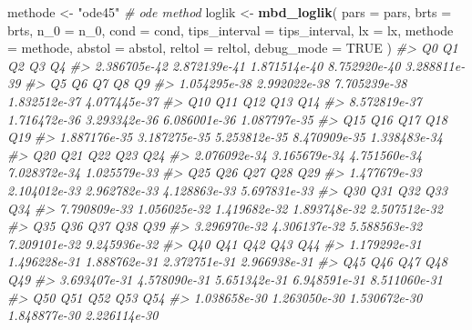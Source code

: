 \documentclass[]{article}
\newenvironment{Shaded}{\begin{snugshade}}{\end{snugshade}}
\newcommand{\CommentTok}[1]{\textcolor[rgb]{0.56,0.35,0.01}{\textit{#1}}}
\newcommand{\DataTypeTok}[1]{\textcolor[rgb]{0.13,0.29,0.53}{#1}}
\newcommand{\DecValTok}[1]{\textcolor[rgb]{0.00,0.00,0.81}{#1}}
\newcommand{\KeywordTok}[1]{\textcolor[rgb]{0.13,0.29,0.53}{\textbf{#1}}}
\newcommand{\NormalTok}[1]{#1}
\newcommand{\OtherTok}[1]{\textcolor[rgb]{0.56,0.35,0.01}{#1}}
\newcommand{\StringTok}[1]{\textcolor[rgb]{0.31,0.60,0.02}{#1}}
\begin{document}
\begin{Shaded}
\begin{Highlighting}[]
\NormalTok{methode <-}\StringTok{ "ode45"} \CommentTok{# ode method}
\NormalTok{loglik <-}\StringTok{ }\KeywordTok{mbd_loglik}\NormalTok{(}
  \DataTypeTok{pars =}\NormalTok{ pars,}
  \DataTypeTok{brts =}\NormalTok{ brts,}
  \DataTypeTok{n_0 =}\NormalTok{ n_}\DecValTok{0}\NormalTok{,}
  \DataTypeTok{cond =}\NormalTok{ cond,}
  \DataTypeTok{tips_interval =}\NormalTok{ tips_interval,}
  \DataTypeTok{lx =}\NormalTok{ lx,}
  \DataTypeTok{methode =}\NormalTok{ methode,}
  \DataTypeTok{abstol =}\NormalTok{ abstol,}
  \DataTypeTok{reltol =}\NormalTok{ reltol,}
  \DataTypeTok{debug_mode =} \OtherTok{TRUE}
\NormalTok{)}
\CommentTok{#>            Q0            Q1            Q2            Q3            Q4 }
\CommentTok{#>  2.386705e-42  2.872139e-41  1.871514e-40  8.752920e-40  3.288811e-39 }
\CommentTok{#>            Q5            Q6            Q7            Q8            Q9 }
\CommentTok{#>  1.054295e-38  2.992022e-38  7.705239e-38  1.832512e-37  4.077445e-37 }
\CommentTok{#>           Q10           Q11           Q12           Q13           Q14 }
\CommentTok{#>  8.572819e-37  1.716472e-36  3.293342e-36  6.086001e-36  1.087797e-35 }
\CommentTok{#>           Q15           Q16           Q17           Q18           Q19 }
\CommentTok{#>  1.887176e-35  3.187275e-35  5.253812e-35  8.470909e-35  1.338483e-34 }
\CommentTok{#>           Q20           Q21           Q22           Q23           Q24 }
\CommentTok{#>  2.076092e-34  3.165679e-34  4.751560e-34  7.028372e-34  1.025579e-33 }
\CommentTok{#>           Q25           Q26           Q27           Q28           Q29 }
\CommentTok{#>  1.477679e-33  2.104012e-33  2.962782e-33  4.128863e-33  5.697831e-33 }
\CommentTok{#>           Q30           Q31           Q32           Q33           Q34 }
\CommentTok{#>  7.790809e-33  1.056025e-32  1.419682e-32  1.893748e-32  2.507512e-32 }
\CommentTok{#>           Q35           Q36           Q37           Q38           Q39 }
\CommentTok{#>  3.296970e-32  4.306137e-32  5.588563e-32  7.209101e-32  9.245936e-32 }
\CommentTok{#>           Q40           Q41           Q42           Q43           Q44 }
\CommentTok{#>  1.179292e-31  1.496228e-31  1.888762e-31  2.372751e-31  2.966938e-31 }
\CommentTok{#>           Q45           Q46           Q47           Q48           Q49 }
\CommentTok{#>  3.693407e-31  4.578090e-31  5.651342e-31  6.948591e-31  8.511060e-31 }
\CommentTok{#>           Q50           Q51           Q52           Q53           Q54 }
\CommentTok{#>  1.038658e-30  1.263050e-30  1.530672e-30  1.848877e-30  2.226114e-30 }

\end{Highlighting}
\end{Shaded}
\end{document}
